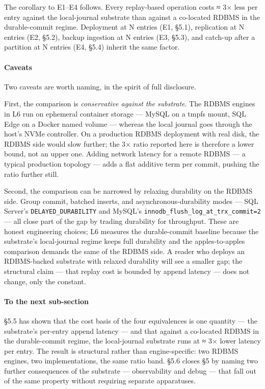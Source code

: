 \documentclass[
]{article}
\begin{document}
The corollary to E1--E4 follows. Every replay-based operation costs ≈ 3×
less per entry against the local-journal substrate than against a
co-located RDBMS in the durable-commit regime. Deployment at N entries
(E1, §5.1), replication at N entries (E2, §5.2), backup ingestion at N
entries (E3, §5.3), and catch-up after a partition at N entries (E4,
§5.4) inherit the same factor.

\paragraph{Caveats}\label{caveats-1}

Two caveats are worth naming, in the spirit of full disclosure.

First, the comparison is \emph{conservative against the substrate}. The
RDBMS engines in L6 run on ephemeral container storage --- MySQL on a
tmpfs mount, SQL Edge on a Docker named volume --- whereas the local
journal goes through the host's NVMe controller. On a production RDBMS
deployment with real disk, the RDBMS side would slow further; the 3×
ratio reported here is therefore a lower bound, not an upper one. Adding
network latency for a remote RDBMS --- a typical production topology ---
adds a flat additive term per commit, pushing the ratio further still.

Second, the comparison can be narrowed by relaxing durability on the
RDBMS side. Group commit, batched inserts, and asynchronous-durability
modes --- SQL Server's \texttt{DELAYED\_DURABILITY} and MySQL's
\texttt{innodb\_flush\_log\_at\_trx\_commit=2} --- all close part of the
gap by trading durability for throughput. These are honest engineering
choices; L6 measures the durable-commit baseline because the substrate's
local-journal regime keeps full durability and the apples-to-apples
comparison demands the same of the RDBMS side. A reader who deploys an
RDBMS-backed substrate with relaxed durability will see a smaller gap;
the structural claim --- that replay cost is bounded by append latency
--- does not change, only the constant.

\paragraph{To the next sub-section}\label{to-the-next-sub-section}

§5.5 has shown that the cost basis of the four equivalences is one
quantity --- the substrate's per-entry append latency --- and that
against a co-located RDBMS in the durable-commit regime, the
local-journal substrate runs at ≈ 3× lower latency per entry. The result
is structural rather than engine-specific: two RDBMS engines, two
implementations, the same ratio band. §5.6 closes §5 by naming two
further consequences of the substrate --- observability and debug ---
that fall out of the same property without requiring separate
apparatuses.
\end{document}
